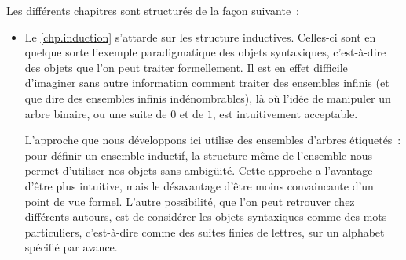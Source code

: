 Les différents chapitres sont structurés de la façon suivante~:
\begin{itemize}
\item Le \cref{chp.induction} s'attarde sur les structure inductives. Celles-ci
  sont en quelque sorte l'exemple paradigmatique des objets syntaxiques,
  c'est-à-dire des objets que l'on peut traiter formellement. Il est en effet
  difficile d'imaginer sans autre information comment traiter des ensembles
  infinis (et que dire des ensembles infinis indénombrables), là où l'idée de
  manipuler un arbre binaire, ou une suite de $0$ et de $1$, est intuitivement
  acceptable.

  L'approche que nous développons ici utilise des ensembles d'arbres étiquetés~:
  pour définir un ensemble inductif, la structure même de l'ensemble nous permet
  d'utiliser nos objets sans ambigüité. Cette approche a l'avantage d'être plus
  intuitive, mais le désavantage d'être moins convaincante d'un point de vue
  formel. L'autre possibilité, que l'on peut retrouver chez différents autours,
  est de considérer les objets syntaxiques comme des mots particuliers,
  c'est-à-dire comme des suites finies de lettres, sur un alphabet spécifié par
  avance.


\end{itemize}
